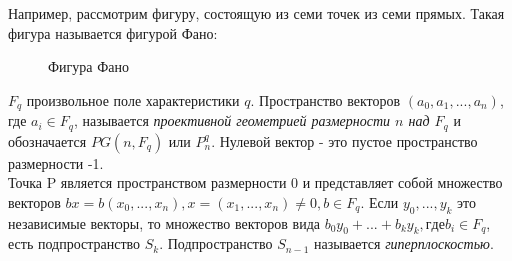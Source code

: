 \documentclass[12pt]{article}
\begin{document}
    Например, рассмотрим фигуру, состоящую из семи точек из семи прямых. Такая фигура называется фигурой Фано:
    \begin{figure}[h]
        \caption {Фигура Фано}
        \label{ris:image}
    \end{figure}
    \newline{} $F_q$  произвольное поле характеристики $q$. Пространство векторов $(a_0, a_1, . . . , a_n)$, где $a_i \in F_q$, называется \textit{проективной геометрией размерности $n$ над $F_q$} и обозначается $PG(n, F_q)$ или $P^q_n$. Нулевой вектор - это пустое пространство размерности -1.\\ Точка P является пространством размерности 0 и представляет собой
    множество векторов $bx = b(x_0, . . . , x_n), x = (x_1, . . . , x_n) \neq 0, b \in F_q$.
    Если $y_0, . . . , y_k$  это независимые векторы, то множество векторов
    вида $b_0y_0 + ... + b_ky_k, где b_i \in F_q$, есть подпространство $S_k$. Подпространство $S_{n-1}$ называется \textit{гиперплоскостью}.
\end{document}
